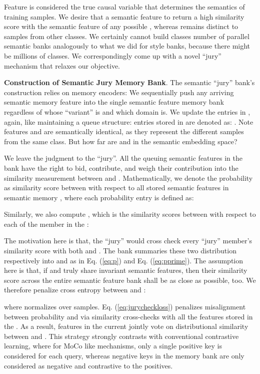 \documentclass[10pt,twocolumn,letterpaper]{article}
\newcommand{\0}{{\bf 0}}
\begin{document}
Feature  is considered the true causal variable that determines the semantics of training samples. We desire that a semantic feature  to return a high similarity score with the semantic feature of any possible , whereas  remains distinct to samples from other classes. We certainly cannot build  classes number of parallel semantic banks analogously to what we did for style banks, because there might be millions of classes. We correspondingly come up with a novel ``jury'' mechanism that relaxes our objective.

{\bf Construction of Semantic Jury Memory Bank}. The semantic ``jury'' bank's construction relies on memory encoders: We sequentially push any arriving semantic memory feature  into the single semantic feature memory bank  regardless of whose ``variant''  is and which domain  is. We update the entries in , again, like maintaining a queue structure: entries stored in  are denoted as: .  Note features  and  are semantically identical, as they represent the different samples from the same class. But how far are  and  in the semantic embedding space?

We leave the judgment to the ``jury''. All the queuing semantic features in the bank have the right to bid, contribute, and weigh their contribution into the similarity measurement between  and . Mathematically, we denote the probability  as similarity score between  with respect to all stored semantic features in semantic memory , where each probability entry  is defined as:
\vspace{-0.05in}

Similarly, we also compute , which is the similarity scores between  with respect to each of the member in the :
\vspace{-0.05in}


The motivation here is that, the ``jury''  would cross check every ``jury'' member's similarity score with both  and . The bank  summaries these two distribution respectively into  and  as in Eq. (\ref{eq:p}) and Eq. (\ref{eq:pprime}). The assumption here is that, if  and  truly share invariant semantic features, then their similarity score across the entire semantic feature bank  shall be as close as possible, too. We therefore penalize cross entropy between   and :

where  normalizes over samples. Eq. (\ref{eq:jurycheckloss}) penalizes misalignment between probability  and  via similarity cross-checks with all the features stored in the . As a result, features in the current  jointly vote on distributional similarity between  and . This strategy strongly contrasts with conventional contrastive learning, where for MoCo like mechanisms, only a single positive key is considered for each query, whereas negative keys in the memory bank are only considered as negative and contrastive to the positives.
\end{document}
